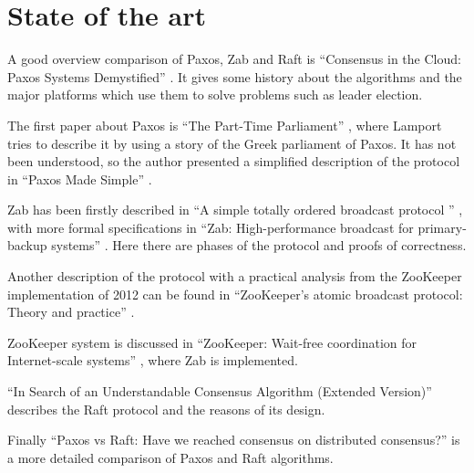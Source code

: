 \chapter{State of the art\label{sec:art}}
A good overview comparison of Paxos, Zab and Raft is ``Consensus in the Cloud: Paxos Systems Demystified'' \cite{ailijiang2016consensus}.
It gives some history about the algorithms and the major platforms which use them to solve problems such as leader election.

The first paper about Paxos is ``The Part-Time Parliament'' \cite{leslie1998part}, where Lamport tries to describe it by using a story of the Greek parliament of Paxos. It has not been understood, so the author presented a simplified description of the protocol in ``Paxos Made Simple'' \cite{lamport2001paxos}.

Zab has been firstly described in ``A simple totally ordered broadcast protocol
'' \cite{reed2008simple}, with more formal specifications in ``Zab: High-performance broadcast for primary-backup systems'' \cite{junqueira2011zab}.
Here there are phases of the protocol and proofs of correctness.

Another description of the protocol with a practical analysis from the ZooKeeper implementation of 2012 can be found in ``ZooKeeper's atomic broadcast protocol: Theory and practice'' \cite{medeiros2012zookeeper}.

ZooKeeper system is discussed in ``ZooKeeper: Wait-free coordination for Internet-scale systems'' \cite{hunt2010zookeeper}, where Zab is implemented.

``In Search of an Understandable Consensus Algorithm (Extended Version)'' \cite{ongaro2014search} describes the Raft protocol and the reasons of its design.

Finally ``Paxos vs Raft: Have we reached consensus on distributed consensus?'' \cite{howard2020paxos} is a more detailed comparison of Paxos and Raft algorithms.